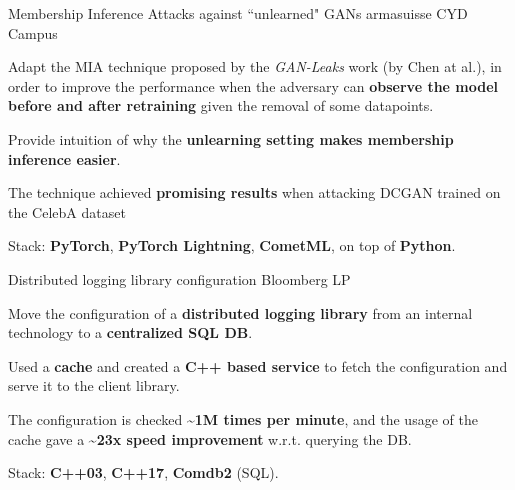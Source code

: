 \begin{cventries}
  \cventry
  {Membership Inference Attacks against ``unlearned" GANs} %
  {} %
  {} %
  {armasuisse CYD Campus} %
  {
    \begin{cvitems} %
      \item Adapt the MIA technique proposed by the \textit{GAN-Leaks} work (by Chen at al.), in order to improve the performance when the adversary can \textbf{observe the model before and after retraining} given the removal of some datapoints.
      \item Provide intuition of why the \textbf{unlearning setting makes membership inference easier}.
      \item The technique achieved \textbf{promising results} when attacking DCGAN trained on the CelebA dataset
      \item Stack: \textbf{PyTorch}, \textbf{PyTorch Lightning}, \textbf{CometML}, on top of \textbf{Python}.
    \end{cvitems}
  }

  \cventry
  {Distributed logging library configuration} %
  {} %
  {} %
  {Bloomberg LP} %
  {
    \begin{cvitems} %
      \item Move the configuration of a \textbf{distributed logging library} from an internal technology to a \textbf{centralized SQL DB}.
      \item Used a \textbf{cache} and created a \textbf{C++ based service} to fetch the configuration and serve it to the client library.
      \item The configuration is checked \textbf{\textasciitilde 1M times per minute}, and the usage of the cache gave a \textbf{\textasciitilde 23x speed improvement} w.r.t. querying the DB.
      \item Stack: \textbf{C++03}, \textbf{C++17}, \textbf{Comdb2} (SQL).
    \end{cvitems}
  }

  

\end{cventries}
